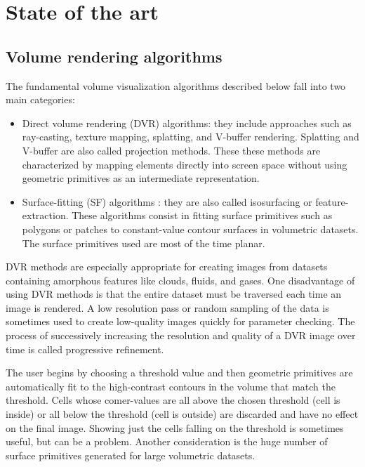 \chapter{State of the art} %
\label{StateOfTheArt}

\section{Volume rendering algorithms}

The fundamental volume visualization algorithms described
below fall into two main categories: 

\begin{itemize}

\item Direct volume rendering (DVR) algorithms: they include approaches such as ray-casting, texture mapping, splatting, and V-buffer rendering. Splatting and V-buffer are also called projection methods. These these methods are characterized by mapping elements directly into screen space without using geometric primitives as an intermediate representation.

\item Surface-fitting (SF) algorithms : they are also called isosurfacing or feature-extraction. These algorithms consist in fitting surface primitives such as
polygons or patches to constant-value contour surfaces in volumetric datasets. The surface primitives used are most of the time planar.

\end{itemize}

DVR methods are especially appropriate for creating images from datasets containing amorphous features like clouds, fluids, and gases. One disadvantage of using DVR methods
is that the entire dataset must be traversed each time an image is
rendered. A low resolution pass or random sampling of the data is
sometimes used to create low-quality images quickly for parameter
checking. The process of successively increasing the resolution
and quality of a DVR image over time is called progressive
refinement.

 The user begins by choosing a threshold value
and then geometric primitives are automatically fit to the high-contrast
contours in the volume that match the threshold. Cells
whose comer-values are all above the chosen threshold (cell is
inside) or all below the threshold (cell is outside) are discarded and
have no effect on the final image. Showing just the cells falling on
the threshold is sometimes useful, but can be a problem. Another
consideration is the huge number of surface primitives generated
for large volumetric datasets. 



